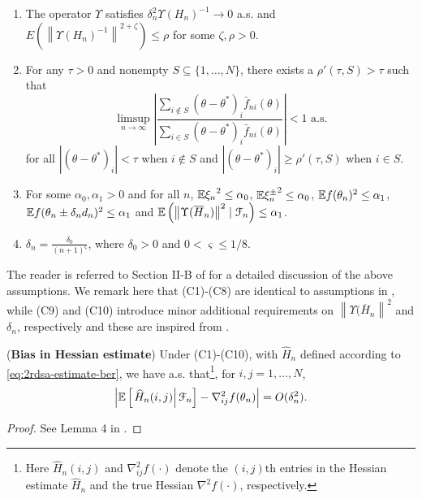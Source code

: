 \begin{enumerate}[label=(\textbf{A\arabic*}),resume]
\item The operator $\Upsilon$ satisfies $\delta_n^2 \Upsilon(H_n)^{-1} \rightarrow 0$ a.s. and  $E(\left\| \Upsilon(H_n)^{-1}\right\|^{2+\zeta}) \le \rho$ for some $\zeta, \rho>0$.

\item For any $\tau >0$ and nonempty $S \subseteq \{1,\ldots,N\}$, there exists a $\rho'(\tau,S)>\tau$ such that 
$$ \limsup_{n\rightarrow \infty} \left| \dfrac{\sum_{i \notin S} (\theta-\theta^*)_i \bar f_{ni}(\theta)}{\sum_{i \in S} (\theta-\theta^*)_i \bar f_{ni}(\theta)}               \right| < 1 \text{ a.s.}$$
for all $|(\theta-\theta^*)_i| < \tau$ when $i \notin S$ and $|(\theta-\theta^*)_i| \ge \rho'(\tau,S)$ when $i\in S$.
\item For some $\alpha_0, \alpha_1>0$ and for all $n$, $\mathbb{E} {\xi_n}^{2} \le \alpha_0$, $\mathbb{E} {\xi_n^{\pm}}^{2} \le \alpha_0$, $\mathbb{E} f(\theta_n)^{2} \le \alpha_1$,  $\mathbb{E} f(\theta_n\pm \delta_n d_n)^{2} \le \alpha_1$ and $\mathbb{E} \left(\left\| \Upsilon(\overline H_n) \right\|^2 \mid \mathcal{F}_n\right) \le \alpha_1$. 
\item  $\delta_n = \frac{\delta_0}{(n+1)^{\varsigma}}$, where $\delta_0 > 0$ and $0 < \varsigma \le 1/8$.
\end{enumerate}
The reader is referred to Section II-B of \cite{prashanth2015rdsa} for a detailed discussion of the above assumptions. We remark here that (C1)-(C8) are identical to assumptions in \cite{prashanth2015rdsa}, while (C9) and (C10) introduce minor additional requirements on $\left\| \Upsilon(\overline H_n \right\|^2$ and $\delta_n$, respectively and these are inspired from \cite{spall-jacobian}.

\begin{lemma}(\textbf{Bias in Hessian estimate})
\label{lemma:2rdsa-bias}
Under (C1)-(C10), with $\widehat H_n$ defined according to \eqref{eq:2rdsa-estimate-ber}, we have a.s. that\footnote{Here $\widehat H_n(i,j)$ and $\nabla^2_{ij}f(\cdot)$ denote the $(i,j)$th entries in the Hessian estimate $\widehat H_n$ and the true Hessian $\nabla^2 f(\cdot)$, respectively.}, for $i,j = 1,\ldots,N$,
\begin{align}
\left|\mathbb{E}\left[
\left. \widehat H_n(i,j) \right| \mathcal{F}_n \right] - \nabla^2_{ij} f(\theta_n)\right| = O(\delta_n^2).
\end{align} 
\end{lemma}
\begin{proof}
See Lemma 4 in \cite{prashanth2015rdsa}.
\end{proof}

